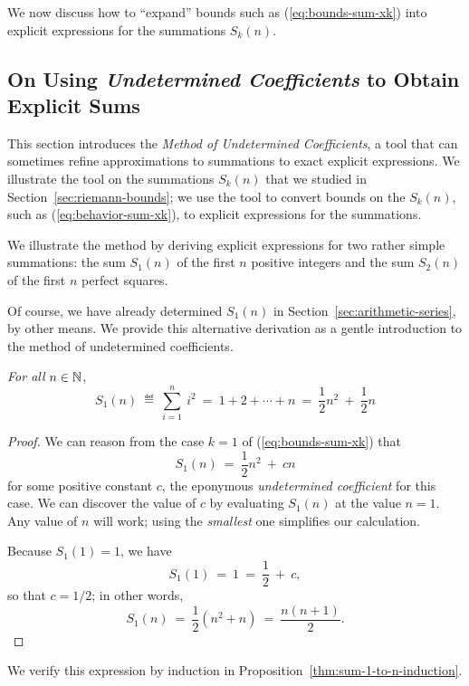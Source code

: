 \medskip

We now discuss how to ``expand'' bounds such as
(\ref{eq:bounds-sum-xk}) into explicit expressions for the summations
$S_k(n)$.


\subsection{On Using {\em Undetermined Coefficients} to Obtain Explicit Sums}
\label{sec:undetermined-coefficients}

This section introduces the {\em Method of Undetermined Coefficients},
a tool that can sometimes refine approximations to summations to exact
explicit expressions.  We illustrate the tool on the summations
$S_k(n)$ that we studied in Section~\ref{sec:riemann-bounds}; we use
the tool to convert bounds on the $S_k(n)$, such as
(\ref{eq:behavior-sum-xk}), to explicit expressions for the
summations.

We illustrate the method by deriving explicit expressions for two
rather simple summations: the sum $S_1(n)$ of the first $n$ positive
integers and the sum $S_2(n)$ of the first $n$ perfect squares.

%
Of course, we have already determined $S_1(n)$ in
Section~\ref{sec:arithmetic-series}, by other means.  We provide this
alternative derivation as a gentle introduction to the method of
undetermined coefficients.

{\em For all} $n \in \mathbb{N}$,
\[
S_1(n) \ \eqdef \ \sum_{i=1}^n \ i^2 
 \ = \  1 + 2 + \cdots + n
 \ = \  \frac{1}{2} n^2 \ + \ \frac{1}{2} n
\]

\begin{proof}
We can reason from the case $k=1$ of (\ref{eq:bounds-sum-xk}) that
\[ S_1(n) \ = \ \frac{1}{2} n^2 \ + \ cn \]
for some positive constant $c$, the eponymous {\it undetermined
  coefficient} for this case.  We can discover the value of $c$ by
evaluating $S_1(n)$ at the value $n =1$.  Any value of $n$ will work;
using the {\em smallest} one simplifies our calculation.

Because $S_1(1) = 1$, we
have
\[ S_1(1) \ = \ 1 \ = \ \frac{1}{2} \ + \ c, \]
so that $c = 1/2$; in other words,
\[ S_1(n) \ = \ \frac{1}{2} \left( n^2 + n \right) \ = \ 
\frac{n(n+1)}{2}.
\]
\end{proof}
We verify this expression by induction in
Proposition~\ref{thm:sum-1-to-n-induction}.

